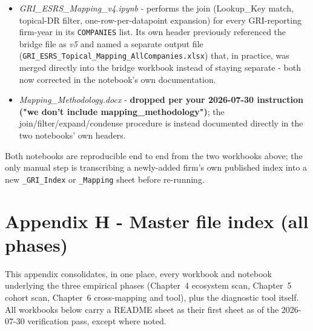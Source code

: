 \documentclass[
]{article}
\begin{document}
\begin{itemize}
  from via external-workbook-link formulas before those were converted to
  static values on the same date. This file did not previously have a
  README sheet; one has now been added as the first sheet.
\item \emph{GRI\_ESRS\_Mapping\_v4.ipynb} - performs the join
  (Lookup\_Key match, topical-DR filter, one-row-per-datapoint expansion) for
  every GRI-reporting firm-year in its \texttt{COMPANIES} list. Its own header
  previously referenced the bridge file as \emph{v5} and named a separate
  output file (\texttt{GRI\_ESRS\_Topical\_Mapping\_AllCompanies.xlsx}) that,
  in practice, was merged directly into the bridge workbook instead of staying
  separate - both now corrected in the notebook's own documentation.
\item \emph{Mapping\_Methodology.docx} - \textbf{dropped per your
  2026-07-30 instruction ("we don't include mapping\_methodology")}; the
  join/filter/expand/condense procedure is instead documented directly in the
  two notebooks' own headers.
\end{itemize}

Both notebooks are reproducible end to end from the two workbooks above; the
only manual step is transcribing a newly-added firm's own published index
into a new \texttt{\_GRI\_Index} or \texttt{\_Mapping} sheet before re-running.

\section*{Appendix H - Master file index (all phases)}\label{app:file-index}

This appendix consolidates, in one place, every workbook and notebook
underlying the three empirical phases (Chapter~4 ecosystem scan, Chapter~5
cohort scan, Chapter~6 cross-mapping and tool), plus the diagnostic tool
itself. All workbooks below carry a README sheet as their first sheet as of
the 2026-07-30 verification pass, except where noted.
\end{document}
